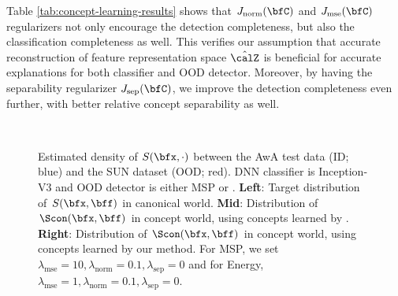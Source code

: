 Table \ref{tab:concept-learning-results} shows that $J_{\textrm{norm}}(\bfC)$ and $J_{\textrm{mse}}(\bfC)$ regularizers not only encourage the detection completeness, but also the classification completeness as well. 
This verifies our assumption that accurate reconstruction of feature representation space $\hat{\calZ}$ is beneficial for accurate explanations for both classifier and OOD detector.
Moreover, by having the separability regularizer $J_{\textrm{sep}}(\bfC)$, we improve the detection completeness even further, with better relative concept separability as well.

\begin{figure}[tbp]
\centering
{}\hfill
{}\hfill
{} \\
\hfill
{}\hfill
{}
\caption{Estimated density of $S(\bfx, \cdot)$ between the AwA test data (ID; blue) and the SUN dataset (OOD; red). DNN classifier is Inception-V3 and OOD detector is either MSP \cite{hendrycks2016msp} or \cite{liu2020energy}.
\textbf{Left}: Target distribution of $S(\bfx, \bff)$ in canonical world. 
\textbf{Mid}: Distribution of $\Scon(\bfx, \bff)$ in concept world, using concepts learned by \cite{yeh2019completeness}.
\textbf{Right}: Distribution of $\Scon(\bfx, \bff)$ in concept world, using concepts learned by our method.
For MSP, we set $\lambda_\textrm{mse} = 10, \lambda_\textrm{norm} = 0.1, \lambda_\textrm{sep} = 0$ and for Energy, $\lambda_\textrm{mse} = 1, \lambda_\textrm{norm} = 0.1, \lambda_\textrm{sep} = 0$.}
\label{fig:score-distribution}
\end{figure}
